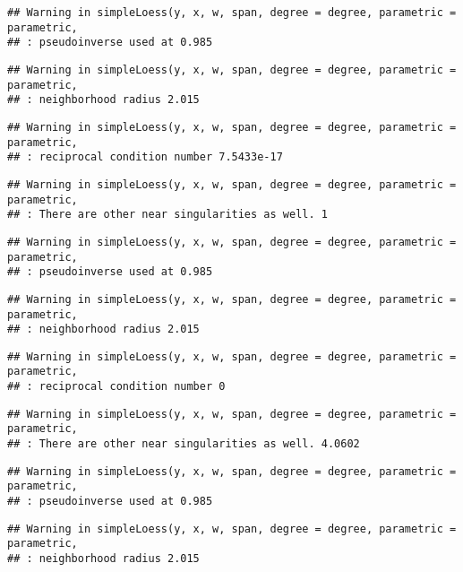 \documentclass[
]{article}
\begin{document}
\begin{verbatim}
## Warning in simpleLoess(y, x, w, span, degree = degree, parametric = parametric,
## : pseudoinverse used at 0.985
\end{verbatim}

\begin{verbatim}
## Warning in simpleLoess(y, x, w, span, degree = degree, parametric = parametric,
## : neighborhood radius 2.015
\end{verbatim}

\begin{verbatim}
## Warning in simpleLoess(y, x, w, span, degree = degree, parametric = parametric,
## : reciprocal condition number 7.5433e-17
\end{verbatim}

\begin{verbatim}
## Warning in simpleLoess(y, x, w, span, degree = degree, parametric = parametric,
## : There are other near singularities as well. 1
\end{verbatim}

\begin{verbatim}
## Warning in simpleLoess(y, x, w, span, degree = degree, parametric = parametric,
## : pseudoinverse used at 0.985
\end{verbatim}

\begin{verbatim}
## Warning in simpleLoess(y, x, w, span, degree = degree, parametric = parametric,
## : neighborhood radius 2.015
\end{verbatim}

\begin{verbatim}
## Warning in simpleLoess(y, x, w, span, degree = degree, parametric = parametric,
## : reciprocal condition number 0
\end{verbatim}

\begin{verbatim}
## Warning in simpleLoess(y, x, w, span, degree = degree, parametric = parametric,
## : There are other near singularities as well. 4.0602
\end{verbatim}

\begin{verbatim}
## Warning in simpleLoess(y, x, w, span, degree = degree, parametric = parametric,
## : pseudoinverse used at 0.985
\end{verbatim}

\begin{verbatim}
## Warning in simpleLoess(y, x, w, span, degree = degree, parametric = parametric,
## : neighborhood radius 2.015
\end{verbatim}
\end{document}
